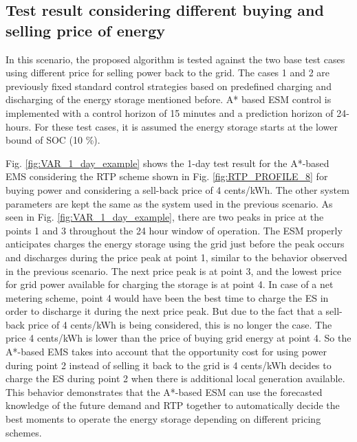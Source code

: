 \subsection{Test result considering different buying and selling price of energy}
In this scenario, the proposed algorithm is tested against the two base test cases using different price for selling power back to the grid. The cases 1 and 2 are previously fixed standard control strategies based on predefined charging and discharging of the energy storage mentioned before. A* based ESM control is implemented with a control horizon of 15 minutes and a prediction horizon of 24-hours. For these test cases, it is assumed the energy storage starts at the lower bound of SOC (10 \%).

Fig. \ref{fig:VAR_1_day_example} shows the 1-day test result for the A*-based EMS considering the RTP scheme shown in Fig. \ref{fig:RTP_PROFILE_8} for buying power and considering a sell-back price of 4 cents/kWh. The other system parameters are kept the same as the system used in the previous scenario. As seen in Fig. \ref{fig:VAR_1_day_example}, there are two peaks in price at the points 1 and 3 throughout the 24 hour window of operation. The ESM properly anticipates charges the energy storage using the grid just before the peak occurs and discharges during the price peak at point 1, similar to the behavior observed in the previous scenario. The next price peak is at point 3, and the lowest price for grid power available for charging the storage is at point 4. In case of a net metering scheme, point 4 would have been the best time to charge the ES in order to discharge it during the next price peak. But due to the fact that a sell-back price of 4 cents/kWh is being considered, this is no longer the case. The price 4 cents/kWh is lower than the price of buying grid energy at point 4. So the A*-based EMS takes into account that the opportunity cost for using power during point 2 instead of selling it back to the grid is 4 cents/kWh decides to charge the ES during point 2 when there is additional local generation available. This behavior demonstrates that the A*-based ESM can use the forecasted knowledge of the future demand and RTP together to automatically decide the best moments to operate the energy storage depending on different pricing schemes.

